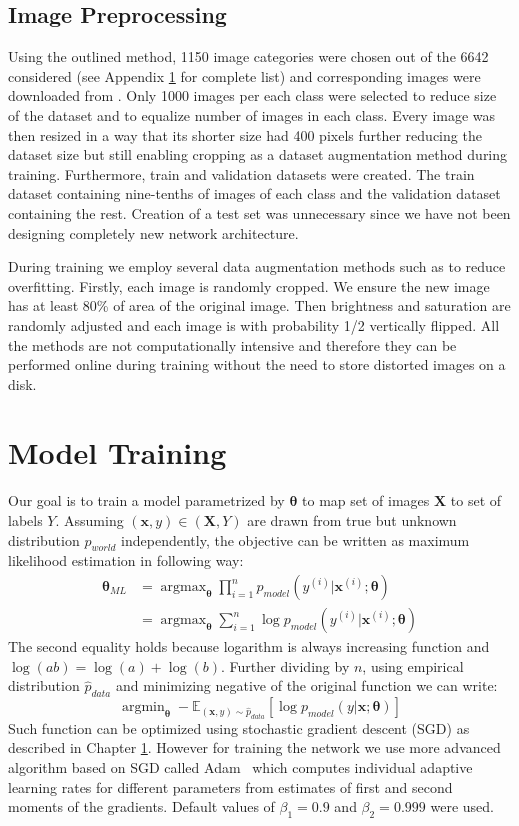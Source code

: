 \subsection{Image Preprocessing}
Using the outlined method, 1150 image categories were chosen out of the 6642 considered (see Appendix \ref{} for complete list) and corresponding images were downloaded from \cite{ImageNetDownload}. Only 1000 images per each class were selected to reduce size of the dataset and to equalize number of images in each class. Every image was then resized in a way that its shorter size had 400 pixels further reducing the dataset size but still enabling cropping as a dataset augmentation method during training. Furthermore, train and validation datasets were created. The train dataset containing nine-tenths of images of each class and the validation dataset containing the rest. Creation of a test set was unnecessary since we have not been designing completely new network architecture.

During training we employ several data augmentation methods such as \cite{simard2003best} to reduce overfitting. Firstly, each image is randomly cropped. We ensure the new image has at least 80\% of area of the original image. Then brightness and saturation are randomly adjusted and each image is with probability 1/2 vertically flipped. All the methods are not computationally intensive and therefore they can be performed online during training without the need to store distorted images on a disk.


\section{Model Training}
Our goal is to train a model parametrized by $\bm{\theta}$ to map set of images $\bm{X}$ to set of labels $Y$. Assuming $(\bm{x},y)\in(\bm{X},Y)$ are drawn from true but unknown distribution $p_{world}$ independently, the objective can be written as maximum likelihood estimation in following way:
\begin{align}
\bm{\theta}_{ML} &=\mathop{\arg\max}_{\bm{\theta}}\prod\limits_{i=1}^{n} p_{model}\left(y^{(i)}|\bm{x}^{(i)};\bm{\theta}\right) \\
&=\mathop{\arg\max}_{\bm{\theta}}\sum\limits_{i=1}^{n} \log p_{model}\left(y^{(i)}|\bm{x}^{(i)};\bm{\theta}\right)
\end{align}
The second equality holds because logarithm is always increasing function and $\log(ab)=\log(a)+\log(b)$. Further dividing by $n$, using empirical distribution $\hat{p}_{data}$ and minimizing negative of the original function we can write:
\begin{equation}
\mathop{\arg\min}_{\bm{\theta}}-\mathbb{E}_{(\bm{x},y)\sim \hat{p}_{data}}\left[\log p_{model}\left(y|\bm{x};\bm{\theta}\right)\right]\label{eq:mle}
\end{equation}
Such function can be optimized using stochastic gradient descent (SGD) as described in Chapter \ref{}. However for training the network we use more advanced algorithm based on SGD called Adam~\cite{adam} which computes individual adaptive learning rates for
different parameters from estimates of first and second moments of the gradients. Default values of $\beta_1 = 0.9$ and $\beta_2 = 0.999$ were used.

